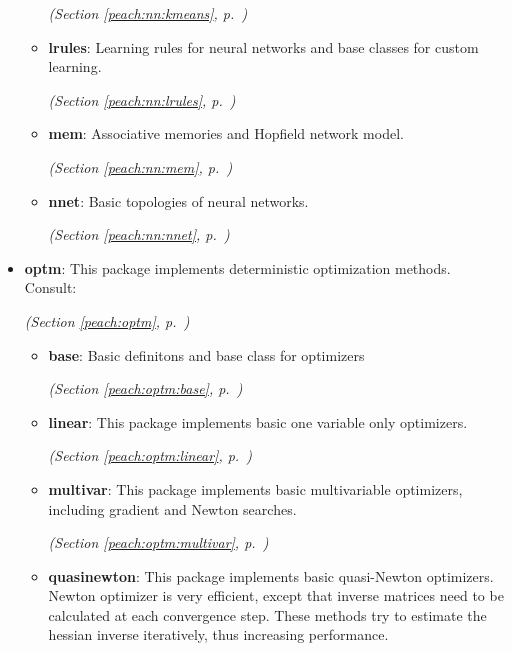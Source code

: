\begin{itemize}
\begin{itemize}
  \textit{(Section \ref{peach:nn:kmeans}, p.~\pageref{peach:nn:kmeans})}

    \item \textbf{lrules}: 
Learning rules for neural networks and base classes for custom learning.


  \textit{(Section \ref{peach:nn:lrules}, p.~\pageref{peach:nn:lrules})}

    \item \textbf{mem}: 
Associative memories and Hopfield network model.


  \textit{(Section \ref{peach:nn:mem}, p.~\pageref{peach:nn:mem})}

    \item \textbf{nnet}: 
Basic topologies of neural networks.


  \textit{(Section \ref{peach:nn:nnet}, p.~\pageref{peach:nn:nnet})}

  \end{itemize}
\item \textbf{optm}: 
This package implements deterministic optimization methods. Consult:


  \textit{(Section \ref{peach:optm}, p.~\pageref{peach:optm})}

  \begin{itemize}
\setlength{\parskip}{0ex}
    \item \textbf{base}: 
Basic definitons and base class for optimizers


  \textit{(Section \ref{peach:optm:base}, p.~\pageref{peach:optm:base})}

    \item \textbf{linear}: 
This package implements basic one variable only optimizers.


  \textit{(Section \ref{peach:optm:linear}, p.~\pageref{peach:optm:linear})}

    \item \textbf{multivar}: 
This package implements basic multivariable optimizers, including gradient and
Newton searches.


  \textit{(Section \ref{peach:optm:multivar}, p.~\pageref{peach:optm:multivar})}

    \item \textbf{quasinewton}: 
This package implements basic quasi-Newton optimizers. Newton optimizer is very
efficient, except that inverse matrices need to be calculated at each
convergence step. These methods try to estimate the hessian inverse iteratively,
thus increasing performance.



\end{itemize}
\end{itemize}
